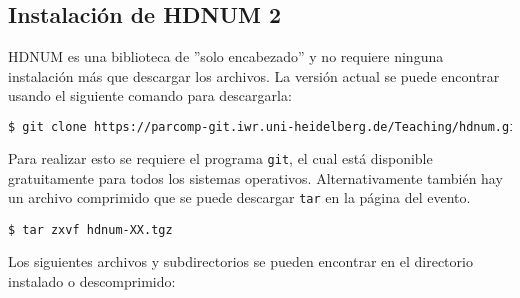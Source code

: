 \documentclass[a4paper,11pt]{article}
\theoremstyle{definition}
\begin{document}
\subsection{Instalación de HDNUM 2}

HDNUM es una biblioteca de ''solo encabezado'' y no requiere ninguna instalación más que descargar los archivos. La versión actual se puede encontrar usando el siguiente comando para descargarla:

\begin{lstlisting}[basicstyle=\ttfamily\footnotesize,language=bash,frame=single]
$ git clone https://parcomp-git.iwr.uni-heidelberg.de/Teaching/hdnum.git
\end{lstlisting}

Para realizar esto se requiere el programa \lstinline{git}, el cual está disponible gratuitamente para todos los sistemas operativos. Alternativamente también hay un archivo comprimido que se puede descargar \lstinline{tar} en la página del evento.
\begin{lstlisting}[basicstyle=\ttfamily\small,frame=single]
$ tar zxvf hdnum-XX.tgz
\end{lstlisting}
Los siguientes archivos y subdirectorios se pueden encontrar en el directorio instalado o descomprimido:
\end{document}
